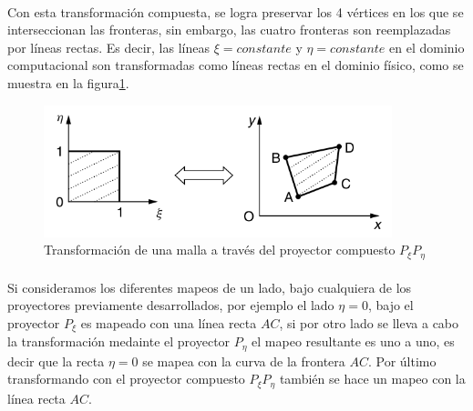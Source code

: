 \documentclass[letterpaper, openright, 12pt]{book}
\begin{document}
    \paragraph*{}
    Con esta transformación compuesta, se logra preservar los 4 vértices en
    los que se interseccionan las fronteras, sin embargo, las cuatro
    fronteras son reemplazadas por líneas rectas. Es decir, las líneas
    $\xi = constante$ y $\eta = constante$ en el dominio computacional son
    transformadas como líneas rectas en el dominio físico, como se muestra
    en la figura\ref{fig:mapeo_xieta}.
    \begin{figure}[htbp!]
        \centering
        \includegraphics[keepaspectratio, width=0.9\textwidth]{./img/mapeo_xieta}
        \captionsetup{margin=2cm}
        \caption[Transformación de malla por $P_{\xi}P_{\eta}$]{Transformación
        de una malla a través del proyector compuesto
        $P_{\xi}P_{\eta}$\cite{farrashkhalvat}}
        \label{fig:mapeo_xieta}
    \end{figure}

    \paragraph*{}
    Si consideramos los diferentes mapeos de un lado, bajo cualquiera de los
    proyectores previamente desarrollados, por ejemplo el lado $\eta = 0$,
    bajo el proyector $P_{\xi}$ es mapeado con una línea recta $AC$, si por
    otro lado se lleva a cabo la transformación medainte el proyector
    $P_{\eta}$ el mapeo resultante es uno a uno, es decir que la recta
    $\eta = 0$ se mapea con la curva de la frontera $AC$. Por último
    transformando con el proyector compuesto $P_{\xi}P_{\eta}$ también se
    hace un mapeo con la línea recta $AC$.
\end{document}
